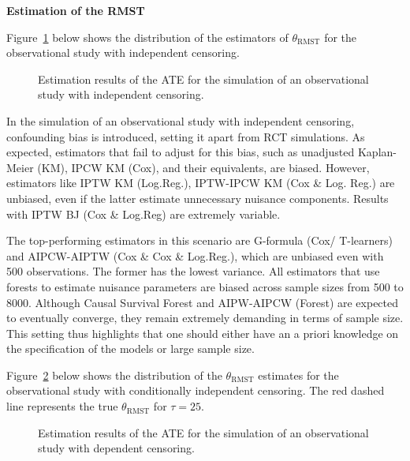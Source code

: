\documentclass[
  11pt,
  a4paper,
]{article}
\theoremstyle{plain}
\theoremstyle{plain}
\theoremstyle{plain}
\theoremstyle{definition}
\theoremstyle{remark}
\begin{document}
\textbf{Estimation of the RMST}

Figure~\ref{fig-obs1} below shows the distribution of the estimators of
\(\theta_{\mathrm{RMST}}\) for the observational study with independent
censoring.

\begin{figure}


\caption{\label{fig-obs1}Estimation results of the ATE for the
simulation of an observational study with independent censoring.}

\end{figure}%

In the simulation of an observational study with independent censoring,
confounding bias is introduced, setting it apart from RCT simulations.
As expected, estimators that fail to adjust for this bias, such as
unadjusted Kaplan-Meier (KM), IPCW KM (Cox), and their equivalents, are
biased. However, estimators like IPTW KM (Log.Reg.), IPTW-IPCW KM (Cox
\& Log. Reg.) are unbiased, even if the latter estimate unnecessary
nuisance components. Results with IPTW BJ (Cox \& Log.Reg) are extremely
variable.

The top-performing estimators in this scenario are G-formula (Cox/
T-learners) and AIPCW-AIPTW (Cox \& Cox \& Log.Reg.), which are unbiased
even with 500 observations. The former has the lowest variance. All
estimators that use forests to estimate nuisance parameters are biased
across sample sizes from 500 to 8000. Although Causal Survival Forest
and AIPW-AIPCW (Forest) are expected to eventually converge, they remain
extremely demanding in terms of sample size. This setting thus
highlights that one should either have an a priori knowledge on the
specification of the models or large sample size.

Figure~\ref{fig-obs2} below shows the distribution of the
\(\theta_{\mathrm{RMST}}\) estimates for the observational study with
conditionally independent censoring. The red dashed line represents the
true \(\theta_{\mathrm{RMST}}\) for \(\tau=25\).

\begin{figure}


\caption{\label{fig-obs2}Estimation results of the ATE for the
simulation of an observational study with dependent censoring.}

\end{figure}%
\end{document}
